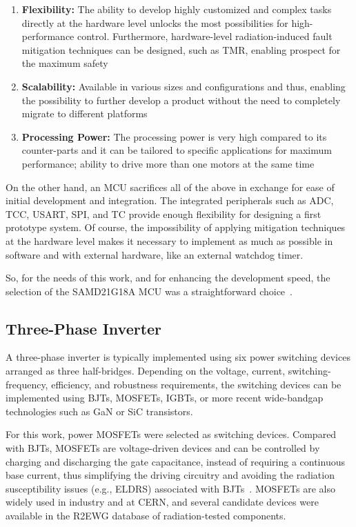 \begin{enumerate}
    \item \textbf{Flexibility:} The ability to develop highly customized and complex tasks directly at the hardware level unlocks the most possibilities for high-performance control. Furthermore, hardware-level radiation-induced fault mitigation techniques can be designed, such as TMR, enabling prospect for the maximum safety
    \item \textbf{Scalability:} Available in various sizes and configurations and thus, enabling the possibility to further develop a product without the need to completely migrate to different platforms
    \item \textbf{Processing Power:} The processing power is very high compared to its counter-parts and it can be tailored to specific applications for maximum performance; ability to drive more than one motors at the same time
\end{enumerate}

On the other hand, an MCU sacrifices all of the above in exchange for ease of initial development and integration. The integrated peripherals such as ADC, TCC, USART, SPI, and TC provide enough flexibility for designing a first prototype system. Of course, the impossibility of applying mitigation techniques at the hardware level makes it necessary to implement as much as possible in software and with external hardware, like an external watchdog timer.

So, for the needs of this work, and for enhancing the development speed, the selection of the SAMD21G18A MCU was a straightforward choice~\cite[pp.~120--121]{zimmaro_phd_thesis}.

\subsection{Three-Phase Inverter}
\label{subsec:three_phase_inverter}
A three-phase inverter is typically implemented using six power switching devices arranged as three half-bridges. Depending on the voltage, current, switching-frequency, efficiency, and robustness requirements, the switching devices can be implemented using BJTs, MOSFETs, IGBTs, or more recent wide-bandgap technologies such as GaN or SiC transistors.

For this work, power MOSFETs were selected as switching devices. Compared with BJTs, MOSFETs are voltage-driven devices and can be controlled by charging and discharging the gate capacitance, instead of requiring a continuous base current, thus simplifying the driving circuitry and avoiding the radiation susceptibility issues (e.g., ELDRS) associated with BJTs~\cite{ferraro_bjt_tns}. MOSFETs are also widely used in industry and at CERN, and several candidate devices were available in the R2EWG database of radiation-tested components.

